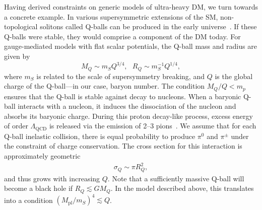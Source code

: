 
Having derived constraints on generic models of ultra-heavy DM, we turn towards a concrete example.
In various supersymmetric extensions of the SM, non-topological solitons called Q-balls can be produced in the early universe~\cite{Coleman:1985ki, Kusenko:1997si}.
If these Q-balls were stable, they would comprise a component of the DM today.
For gauge-mediated models with flat scalar potentials, the Q-ball mass and radius are given by
\begin{equation}
\label{eq:Qballprop}
M_Q \sim m_S Q^{3/4}, ~~~ R_Q \sim m_S^{-1} Q^{1/4},
\end{equation}
where $m_S$ is related to the scale of supersymmetry breaking, and $Q$ is the global charge of the Q-ball---in our case, baryon number.
The condition $M_Q/Q < m_p$ ensures that the Q-ball is stable against decay to nucleons.
When a baryonic Q-ball interacts with a nucleon, it induces the dissociation of the nucleon and absorbs its baryonic charge.
During this proton decay-like process, excess energy of order $\Lambda_\text{QCD}$ is released via the emission of 2--3 pions~\cite{Kusenko:1998}.
We assume that for each Q-ball inelastic collision, there is equal probability to produce $\pi^0$ and $\pi^\pm$ under the constraint of charge conservation.
The cross section for this interaction is approximately geometric
\begin{align}
\sigma_Q \sim \pi R_Q^2,
\end{align}
and thus grows with increasing $Q$.
Note that a sufficiently massive Q-ball will become a black hole if $R_Q \lesssim G M_Q$.
In the model described above, this translates into a condition $(M_\text{pl}/m_S)^4 \lesssim Q$.

